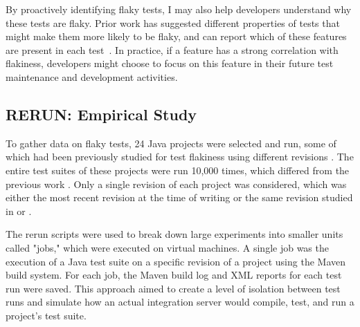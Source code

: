 By proactively identifying flaky tests, I may also help developers understand why these tests are flaky.
Prior work has suggested different properties of tests that might make them more likely to be flaky, and \sysName can report which of these features are present in each test~\cite{eck2019understanding,ahmad2021empirical}.
In practice, if a feature has a strong correlation with flakiness, developers might choose to focus on this feature in their future test maintenance and development activities. 



\subsection{RERUN: Empirical Study}
\label{sec:flakeFlaggerStudy}
%




To gather data on flaky tests, 24 Java projects were selected and run, some of which had been previously studied for test flakiness using different revisions \cite{bell2018deflaker} \cite{lam2019idflakies}. The entire test suites of these projects were run 10,000 times, which differed from the previous work \cite{bell2018deflaker} \cite{lam2019idflakies}. Only a single revision of each project was considered, which was either the most recent revision at the time of writing or the same revision studied in \cite{bell2018deflaker} or \cite{lam2019idflakies}.

The rerun scripts were used to break down large experiments into smaller units called "jobs," which were executed on virtual machines. A single job was the execution of a Java test suite on a specific revision of a project using the Maven build system. For each job, the Maven build log and XML reports for each test run were saved. This approach aimed to create a level of isolation between test runs and simulate how an actual integration server would compile, test, and run a project's test suite.


